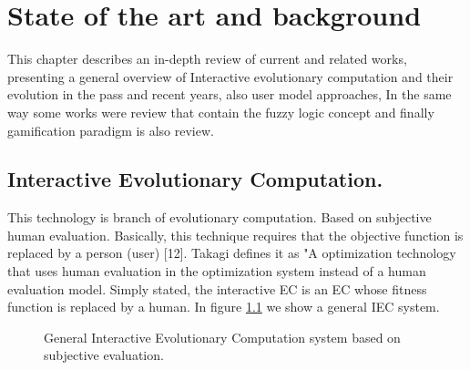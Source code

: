 \chapter{State of the art and background} \label{}
This chapter describes an in-depth review of current and related works,
presenting a general overview of Interactive evolutionary computation and their
evolution in the pass and recent years, also user model approaches, In the same
way some works were review that contain the fuzzy logic concept and finally
gamification paradigm is also review.


\section{Interactive Evolutionary Computation.}

This technology is branch of evolutionary computation. Based on subjective human
evaluation. Basically, this technique requires that the objective function is
replaced by a person (user) [12]. Takagi defines it as "A optimization
technology that uses human evaluation in the optimization system instead of a
human evaluation model. Simply stated, the interactive EC is an EC whose fitness
function is replaced by a human.  In figure \ref{fig:IEC} we show a general IEC
system.

\begin{figure}
	\captionsetup{justification=centering,margin=2cm}
	\centering
	\setlength\fboxsep{0pt}
	\setlength\fboxrule{0.7pt}
	\caption{ General Interactive Evolutionary Computation system based on subjective evaluation.}
	\label{fig:IEC}
\end{figure}



